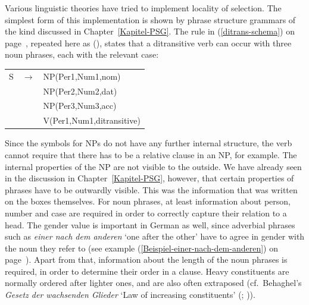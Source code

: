 Various linguistic theories have tried to implement locality of selection. The simplest form of this implementation is shown by
phrase structure grammars of the kind discussed in Chapter~\ref{Kapitel-PSG}. The rule in (\ref{ditrans-schema}) on
page~\pageref{ditrans-schema}, repeated here as (), states that a ditransitive verb can occur with three noun phrases, each
with the relevant case:
\ea
\begin{tabular}[t]{@{}l@{ }l@{ }l}
S  & $\to$ & NP({Per1},{Num1},{nom}) \\
   &       & NP(Per2,Num2,{dat})\\
   &       & NP(Per3,Num3,{acc})\\
   &       & V({Per1},{Num1},ditransitive)\\
\end{tabular}
\z
Since the symbols for NPs do not have any further internal structure, the verb cannot require that there has to be a relative
clause in an NP, for example. The internal properties of the NP are not visible to the outside.
We have already seen in the discussion in Chapter~\ref{Kapitel-PSG}, however, that certain properties of phrases have to be outwardly
visible. This was the information that was written on the boxes themselves. For noun phrases, at least information about
person, number and case are required in order to correctly capture their relation to a head.
The gender value is important in German as well, since adverbial phrases such as \emph{einer nach
  dem anderen} `one after the other' have to agree in gender with the noun they refer to
(see example (\ref{Beispiel-einer-nach-dem-anderen}) on
page~\pageref{Beispiel-einer-nach-dem-anderen}). Apart from that, information about the length of
the noun phrases is required, in order to determine their order in a clause. Heavy constituents are normally ordered after lighter ones, and are also often
extraposed (cf.\ Behaghel's \textit{Gesetz der wachsenden Glieder} `Law of increasing constituents' (\citeyear[]{Behaghel09a}; \citeyear[]{Behaghel30})). 

